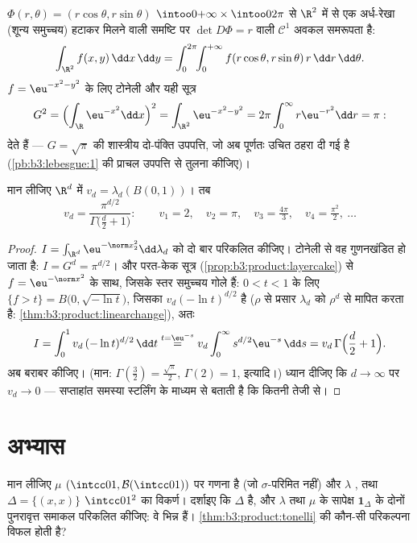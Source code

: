 \begin{example}[ध्रुवीय निर्देशांक; गाउसीय पुनः]
\label{ex:b3:product:polar}
$\Phi(r, \theta) = (r\cos\theta, r\sin\theta)$ $\intoo0{+\infty}\times\intoo0{2\pi}$ से $\R^2$ में से एक अर्ध-रेखा (शून्य समुच्चय) हटाकर
मिलने वाली समष्टि पर $\det D\Phi =
r$ वाली $\mathcal
C^1$ अवकल समरूपता
है:
\[
\int_{\R^2}f(x, y)\,\dd x\,\dd y
= \int_0^{2\pi}\!\!\int_0^{+\infty}
f(r\cos\theta, r\sin\theta)\,r\,\dd r\,\dd\theta .
\]
$f = \eu^{-x^2-y^2}$ के लिए टोनेली और यही सूत्र
\[
G^2 = \Bigl(\int_\R \eu^{-x^2}\dd x\Bigr)^2
= \int_{\R^2}\eu^{-x^2-y^2}
= 2\pi\int_0^\infty r\eu^{-r^2}\dd r = \pi:
\]
देते हैं --- $G = \sqrt\pi$ की शास्त्रीय दो-पंक्ति उपपत्ति, जो अब पूर्णतः
उचित ठहरा दी गई है (\cref{pb:b3:lebesgue:1} की प्राचल उपपत्ति से तुलना कीजिए)।
\end{example}

\begin{theorem}[इकाई गोले का आयतन]
\label{thm:b3:product:ballvolume}
मान लीजिए $\R^d$ में $v_d = \lambda_d(B(0,1))$। तब
\[
v_d = \frac{\pi^{d/2}}{\Gamma\bigl(\frac d2 + 1\bigr)} :
\qquad
v_1 = 2,\quad v_2 = \pi,\quad v_3 = \tfrac{4\pi}3,\quad
v_4 = \tfrac{\pi^2}2,\ \dots
\]
\end{theorem}

\begin{proof}
$I = \int_{\R^d}\eu^{-\norm x_2^2}\dd\lambda_d$ को दो बार परिकलित कीजिए। टोनेली से वह गुणनखंडित हो जाता है:
$I = G^d = \pi^{d/2}$। और परत-केक सूत्र (\cref{prop:b3:product:layercake}) से $f = \eu^{-
\norm x^2}$ के साथ, जिसके स्तर
समुच्चय गोले हैं: $0 < t < 1$ के लिए $\{f > t\} =
B\bigl(0, \sqrt{-\ln t}\bigr)$, जिसका  $v_d(-\ln t)^{d/2}$ है ($\rho$
से प्रसार $\lambda_d$ को $\rho^d$ से मापित करता है: \cref{thm:b3:product:linearchange}), अतः
\[
I = \int_0^1 v_d\,(-\ln t)^{d/2}\,\dd t
\overset{t = \eu^{-s}}{=}
v_d\int_0^\infty s^{d/2}\eu^{-s}\,\dd s
= v_d\,\Gamma\Bigl(\frac d2 + 1\Bigr).
\]
अब बराबर कीजिए। (मान: $\Gamma(\frac32) = \frac{\sqrt\pi}2$, $\Gamma(2) = 1$, इत्यादि।) ध्यान दीजिए कि
$d \to \infty$ पर $v_d \to 0$ --- सप्ताहांत समस्या स्टर्लिंग के माध्यम से बताती
है कि कितनी तेजी से।
\end{proof}

\section{अभ्यास}

\begin{exercise}[$\star$]\label{exo:b3:product:1}
मान लीजिए $\mu$ $(\intcc01, \mathcal
B(\intcc01))$ पर गणना  है (जो $\sigma$-परिमित नहीं) और
$\lambda$ , तथा $\Delta = \{(x,x)\}$ $\intcc01^2$ का विकर्ण। दर्शाइए कि $\Delta$
 है, और $\lambda$ तथा $\mu$ के सापेक्ष $\mathbf 1_\Delta$ के दोनों पुनरावृत्त
समाकल परिकलित कीजिए: वे भिन्न हैं। \cref{thm:b3:product:tonelli} की कौन-सी परिकल्पना विफल
होती है?
\end{exercise}

